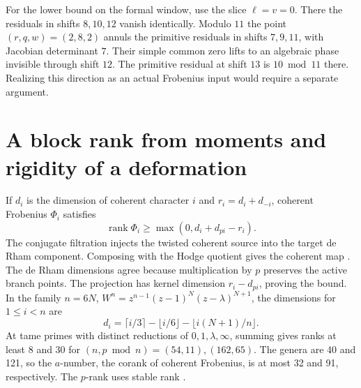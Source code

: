 \documentclass[11pt]{article}
\begin{document}
For the lower bound on the formal window, use the slice
\(\ell=v=0\). There the residuals in shifts \(8,10,12\)
vanish identically. Modulo \(11\) the point \((r,q,w)=(2,8,2)\)
annuls the primitive residuals in shifts \(7,9,11\), with
Jacobian determinant \(7\). Their simple common zero lifts
to an algebraic phase invisible through shift \(12\).
The primitive residual at shift \(13\) is \(10\bmod11\)
there. Realizing this direction as an actual Frobenius input
would require a separate argument.

\section{A block rank from moments and rigidity of a deformation}
\label{sec:marked-block}

If \(d_i\) is the dimension of coherent character \(i\) and
\(r_i=d_i+d_{-i}\), coherent Frobenius \(\Phi_i\) satisfies
\[
       \operatorname{rank}\Phi_i\ge \max(0,d_i+d_{pi}-r_i).
\]
The conjugate filtration injects the twisted coherent source
into the target de Rham component. Composing with the Hodge quotient gives
the coherent map \cite[\S\S2.5 and 3.1]{moonen}.
The de Rham dimensions agree because
multiplication by \(p\) preserves the active branch points.
The projection has kernel dimension \(r_i-d_{pi}\), proving
the bound. In the family \(n=6N\),
\(W^n=z^{n-1}(z-1)^N(z-\lambda)^{N+1}\), the dimensions for
\(1\le i<n\) are
\[
      d_i=\lceil i/3\rceil-\lfloor i/6\rfloor
                       -\lfloor i(N+1)/n\rfloor.
\]
At tame primes with distinct reductions of \(0,1,\lambda,\infty\),
summing gives ranks at least 8 and 30 for
\((n,p\bmod n)=(54,11),(162,65)\). The genera are 40 and 121,
so the \(a\)-number, the corank of coherent Frobenius, is at
most 32 and 91, respectively. The \(p\)-rank uses stable
rank \cite[\S\S2.1, 2.5 and 3.1]{moonen}.
\end{document}
